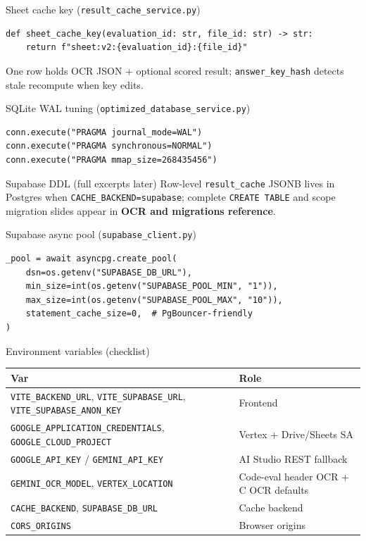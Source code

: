 \documentclass[aspectratio=169]{beamer}
\begin{document}
\begin{frame}[fragile]{Sheet cache key (\texttt{result\_cache\_service.py})}
\begin{lstlisting}[style=py]
def sheet_cache_key(evaluation_id: str, file_id: str) -> str:
    return f"sheet:v2:{evaluation_id}:{file_id}"
\end{lstlisting}
\vfill
\tiny One row holds OCR JSON + optional scored result; \texttt{answer\_key\_hash} detects stale recompute when key edits.
\end{frame}

\begin{frame}[fragile]{SQLite WAL tuning (\texttt{optimized\_database\_service.py})}
\begin{lstlisting}[style=py]
conn.execute("PRAGMA journal_mode=WAL")
conn.execute("PRAGMA synchronous=NORMAL")
conn.execute("PRAGMA mmap_size=268435456")
\end{lstlisting}
\end{frame}

\begin{frame}{Supabase DDL (full excerpts later)}
  \small
  Row-level \texttt{result\_cache} JSONB lives in Postgres when \texttt{CACHE\_BACKEND=supabase}; complete \texttt{CREATE TABLE} and scope migration slides appear in \textbf{OCR and migrations reference}.
\end{frame}

\begin{frame}[fragile]{Supabase async pool (\texttt{supabase\_client.py})}
\begin{lstlisting}[style=py]
_pool = await asyncpg.create_pool(
    dsn=os.getenv("SUPABASE_DB_URL"),
    min_size=int(os.getenv("SUPABASE_POOL_MIN", "1")),
    max_size=int(os.getenv("SUPABASE_POOL_MAX", "10")),
    statement_cache_size=0,  # PgBouncer-friendly
)
\end{lstlisting}
\end{frame}

\begin{frame}{Environment variables (checklist)}
  \tiny
  \begin{tabular}{@{}ll@{}}
    \toprule
    Var & Role \\
    \midrule
    \texttt{VITE\_BACKEND\_URL}, \texttt{VITE\_SUPABASE\_URL}, \texttt{VITE\_SUPABASE\_ANON\_KEY} & Frontend \\
    \texttt{GOOGLE\_APPLICATION\_CREDENTIALS}, \texttt{GOOGLE\_CLOUD\_PROJECT} & Vertex + Drive/Sheets SA \\
    \texttt{GOOGLE\_API\_KEY} / \texttt{GEMINI\_API\_KEY} & AI Studio REST fallback \\
    \texttt{GEMINI\_OCR\_MODEL}, \texttt{VERTEX\_LOCATION} & Code-eval header OCR + C OCR defaults \\
    \texttt{CACHE\_BACKEND}, \texttt{SUPABASE\_DB\_URL} & Cache backend \\
    \texttt{CORS\_ORIGINS} & Browser origins \\
    \bottomrule
  \end{tabular}
\end{frame}
\end{document}
